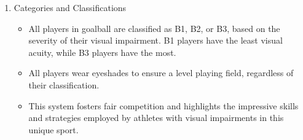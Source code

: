 \begin{enumerate}
\item Categories and Classifications
    \begin{itemize}
    \item All players in goalball are classified as B1, B2, or B3, based on the severity of their visual impairment. B1 players have the least visual acuity, while B3 players have the most. 
    \item All players wear eyeshades to ensure a level playing field, regardless of their classification. 
    \item This system fosters fair competition and highlights the impressive skills and strategies employed by athletes with visual impairments in this unique sport.
    \end{itemize}

\end{enumerate}